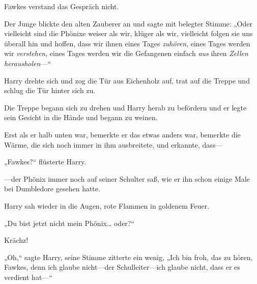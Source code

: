 Fawkes verstand das Gespräch nicht.

Der Junge blickte den alten Zauberer an und sagte mit belegter Stimme: „Oder vielleicht sind die Phönixe weiser als wir, klüger als wir, vielleicht folgen sie uns überall hin und hoffen, dass wir ihnen eines Tages \emph{zuhören}, eines Tages werden wir \emph{verstehen}, eines Tages werden wir die Gefangenen einfach \emph{aus} ihren \emph{Zellen} \emph{herausholen}—“

Harry drehte sich und zog die Tür aus Eichenholz auf, trat auf die Treppe und schlug die Tür hinter sich zu.

Die Treppe begann sich zu drehen und Harry herab zu befördern und er legte sein Gesicht in die Hände und begann zu weinen.

Erst als er halb unten war, bemerkte er das etwas anders war, bemerkte die Wärme, die sich noch immer in ihm ausbreitete, und erkannte, dass—

„Fawkes?“ flüsterte Harry.

—der Phönix immer noch auf seiner Schulter saß, wie er ihn schon einige Male bei Dumbledore gesehen hatte.

Harry sah wieder in die Augen, rote Flammen in goldenem Feuer.

„Du bist jetzt nicht mein Phönix… oder?“

Krächz!

„Oh,“ sagte Harry, seine Stimme zitterte ein wenig, „Ich bin froh, das zu hören, Fawkes, denn ich glaube nicht—der Schulleiter—ich glaube nicht, dass er es verdient hat—“

